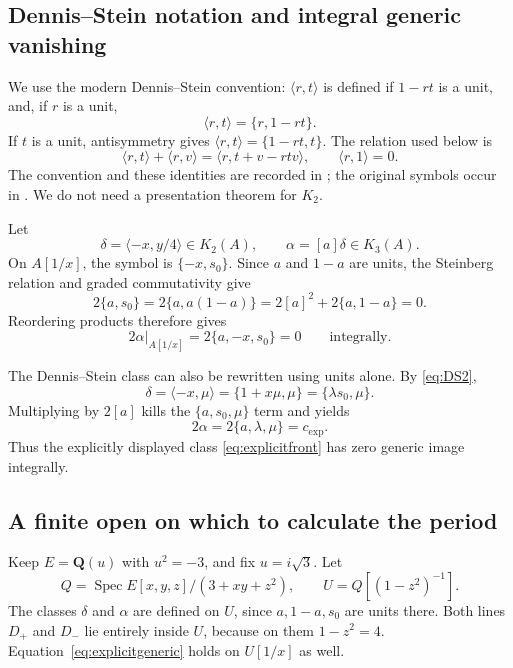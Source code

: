 \documentclass[11pt,a4paper]{article}
\theoremstyle{remark}
\newcommand{\Q}{\mathbf Q}
\newcommand{\Spec}{\operatorname{Spec}}
\begin{document}
\subsection{Dennis--Stein notation and integral generic vanishing}
We use the modern Dennis--Stein convention: $\langle r,t\rangle$ is defined if $1-rt$ is a unit, and, if $r$ is a unit,
\[
\langle r,t\rangle=\{r,1-rt\}.
\]
If $t$ is a unit, antisymmetry gives $\langle r,t\rangle=\{1-rt,t\}$. The relation used below is
\begin{equation}\label{eq:DS2}
\langle r,t\rangle+\langle r,v\rangle
=\langle r,t+v-rtv\rangle,
\qquad \langle r,1\rangle=0.
\end{equation}
The convention and these identities are recorded in \cite[Chapter~III, Definition~5.11 and (D1)--(D3)]{Weibel}; the original symbols occur in \cite{DennisStein}. We do not need a presentation theorem for $K_2$.

Let
\[
\delta=\langle -x,y/4\rangle\in K_2(A),\qquad
\alpha=[a]\delta\in K_3(A).
\]
On $A[1/x]$, the symbol is $\{-x,s_0\}$. Since $a$ and $1-a$ are units, the Steinberg relation and graded commutativity give
\[
2\{a,s_0\}=2\{a,a(1-a)\}
=2[a]^2+2\{a,1-a\}=0.
\]
Reordering products therefore gives
\begin{equation}\label{eq:explicitgeneric}
2\alpha|_{A[1/x]}=2\{a,-x,s_0\}=0
\qquad\text{integrally}.
\end{equation}

The Dennis--Stein class can also be rewritten using units alone. By \eqref{eq:DS2},
\[
\delta=\langle -x,\mu\rangle=\{1+x\mu,\mu\}
=\{\lambda s_0,\mu\}.
\]
Multiplying by $2[a]$ kills the $\{a,s_0,\mu\}$ term and yields
\begin{equation}\label{eq:explicitDS}
2\alpha=2\{a,\lambda,\mu\}=c_{\mathrm{exp}}.
\end{equation}
Thus the explicitly displayed class \eqref{eq:explicitfront} has zero generic image integrally.

\subsection{A finite open on which to calculate the period}
Keep $E=\Q(u)$ with $u^2=-3$, and fix $u=i\sqrt3$. Let
\[
Q=\Spec E[x,y,z]/(3+xy+z^2),\qquad
U=Q[(1-z^2)^{-1}].
\]
The classes $\delta$ and $\alpha$ are defined on $U$, since $a,1-a,s_0$ are units there. Both lines $D_+$ and $D_-$ lie entirely inside $U$, because on them $1-z^2=4$. Equation~\eqref{eq:explicitgeneric} holds on $U[1/x]$ as well.
\end{document}
